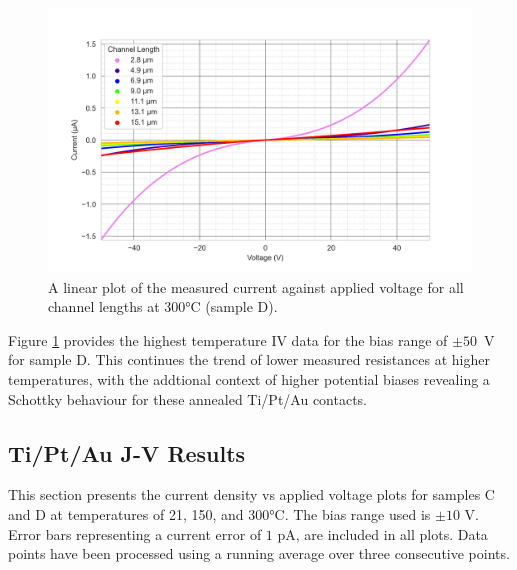 \begin{refsection}
\begin{figure}[H]
    \centering
    \includegraphics[width=\textwidth]{Chapter3/Figs/Raster/Sample D 2019/IV/50V IV characteristics at 300 C.png}
    \caption{A linear plot of the measured current against applied voltage for all channel lengths at 300\si{\degreeCelsius} (sample D).}
    \label{fig:D_current_voltage_300_50V}
\end{figure}
Figure \ref{fig:D_current_voltage_300_50V} provides the highest temperature IV data for the bias range of $\pm50$~\si{\volt} for sample D. This continues the trend of lower measured resistances at higher temperatures, with the addtional context of higher potential biases revealing a Schottky behaviour for these annealed Ti/Pt/Au contacts.

\subsection{Ti/Pt/Au J-V Results}
This section presents the current density vs applied voltage plots for samples C and D at temperatures of 21, 150, and 300\si{\degreeCelsius}. The bias range used is $\pm10$ \si{\volt}. Error bars representing a current error of $1$ \si{\pico\ampere}, are included in all plots. Data points have been processed using a running average over three consecutive points. 


\end{refsection}
